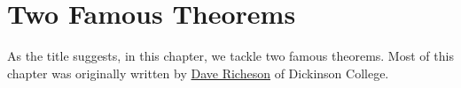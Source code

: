 \chapter{Two Famous Theorems}\label{chap:two famous theorems}

As the title suggests, in this chapter, we tackle two famous theorems. Most of this chapter was originally written by \href{http://users.dickinson.edu/~richesod/}{Dave Richeson} of Dickinson College.